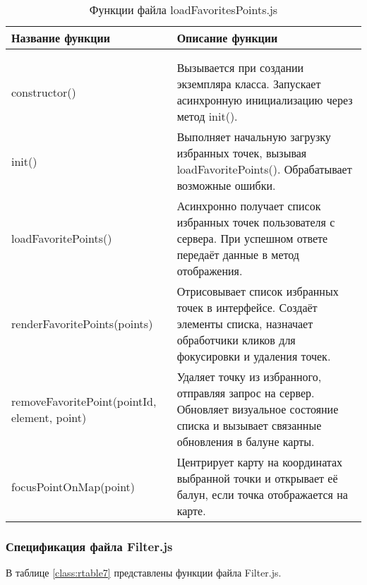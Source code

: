 \begin{xltabular}{\textwidth}{|p{5cm}|X|}
	\caption{Функции файла loadFavoritesPoints.js\label{class:rtable6}}\\
	\hline \centrow Название функции & \centrow Описание функции\\
	\hline {} & \\ \hline
	\endfirsthead
	 & \\ \hline
	\finishhead
	constructor() & Вызывается при создании экземпляра класса. Запускает асинхронную инициализацию через метод init().\\
	\hline init() & Выполняет начальную загрузку избранных точек, вызывая loadFavoritePoints(). Обрабатывает возможные ошибки.\\
	\hline loadFavoritePoints() & Асинхронно получает список избранных точек пользователя с сервера. При успешном ответе передаёт данные в метод отображения.\\
	\hline renderFavorite\-Points(points) & Отрисовывает список избранных точек в интерфейсе. Создаёт элементы списка, назначает обработчики кликов для фокусировки и удаления точек.\\
	\hline removeFavorite\-Point(pointId, element, point) & Удаляет точку из избранного, отправляя запрос на сервер. Обновляет визуальное состояние списка и вызывает связанные обновления в балуне карты.\\
	\hline focusPointOn\-Map(point) & Центрирует карту на координатах выбранной точки и открывает её балун, если точка отображается на карте.\\
\end{xltabular}

\subsubsection{Спецификация файла Filter.js}

В таблице \ref{class:rtable7} представлены функции файла Filter.js.


